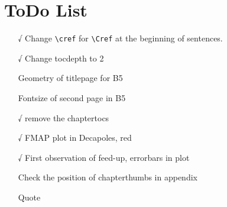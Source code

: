 \chapter*{ToDo List}

\begin{itemize}
    \tightlist
    \item[√] Change \verb|\cref| for \verb|\Cref| at the beginning of sentences.
    \item[√] Change tocdepth to 2
    \item[ ] Geometry of titlepage for B5
    \item[ ] Fontsize of second page in B5
    \item[√] remove the chaptertocs
    \item[√] FMAP plot in Decapoles, red
    \item[√] First observation of feed-up, errorbars in plot
    \item[ ] Check the position of chapterthumbs in appendix
    \item[ ] Quote
\end{itemize}